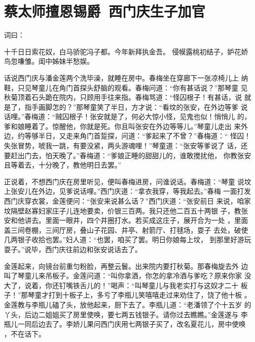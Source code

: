 \chapter{蔡太师擅恩锡爵~西门庆生子加官}

词曰：

十千日日索花奴，白马骄驼冯子都。今年新拜执金吾。
侵幙露桃初结子，妒花娇鸟忽嗛雏。闺中姊妹半愁娱。

话说西门庆与潘金莲两个洗毕澡，就睡在房中。春梅坐在穿廊下一张凉椅儿上
纳鞋，只见琴童儿在角门首探头舒脑的观看。春梅问道：“你有甚话说？”那琴童
见秋菊顶着石头跪在院内，只顾用手往来指。春梅骂道：“怪囚根子！有甚话，说
就是了，指手画脚怎的？”那琴童笑了半日，方才说：“看坟的张安，在外边等爹
说话哩。”春梅道：“贼囚根子！张安就是了，何必大惊小怪，见鬼也似！悄悄儿
的，爹和娘睡着了。惊醒他，你就是死。你且叫张安在外边等等儿。”琴童儿走出
来外边，约等够半日，又走来角门首踅探，问道：“爹起来了不曾？”春梅道：“
怪囚！失张冒势，唬我一跳，有要没紧，两头游魂哩！”琴童道：“张安等爹说了
话，还要赶出门去，怕天晚了。”春梅道：“爹娘正睡的甜甜儿的，谁敢搅扰他，
你教张安且等着去，十分晚了，教他明日去罢。”

正说着，不想西门庆在房里听见，便叫春梅进房，问谁说话。春梅道：“琴童
说坟上张安儿在外边，见爹说话哩。”西门庆道：“拿衣我穿，等我起去。”春梅
一面打发西门庆穿衣裳，金莲便问：“张安来说甚么话？”西门庆道：“张安前日
来说，咱家坟隔壁赵寡妇家庄子儿连地要卖，价银三百两。我只还他二百五十两银
子，教张安和他讲去。里面一眼井，四个井圈打水。若买成这庄子，展开合为一处
，里面盖三间卷棚，三间厅房，叠山子花园、井亭、射箭厅、打毬场，耍子
去处，破使几两银子收拾也罢。”妇人道：“也罢，咱买了罢。明日你娘每上坟，
到那里好游玩耍子。”说毕，西门庆往前边和张安说话去了。

金莲起来，向镜台前重匀粉脸，再整云鬟。出来院内要打秋菊。那春梅旋去外
边叫了琴童儿来吊板子。金莲问道：“叫你拿酒，你怎的拿冷酒与爹吃？原来你家
没大了，说着，你还钉嘴铁舌儿的！”喝声：“叫琴童儿与我老实打与这奴才二十
板子！”那琴童才打到十板子上，多亏了李瓶儿笑嘻嘻走过来劝住了，饶了他十板
。金莲教与李瓶儿磕了头，放他起来，厨下去了。李瓶儿道：“老潘领了个十五岁
的丫头，后边二姐姐买了房里使唤，要七两五钱银子。请你过去瞧瞧。”金莲遂与
李瓶儿一同后边去了。李娇儿果问西门庆用七两银子买了，改名夏花儿，房中使唤
，不在话下。

